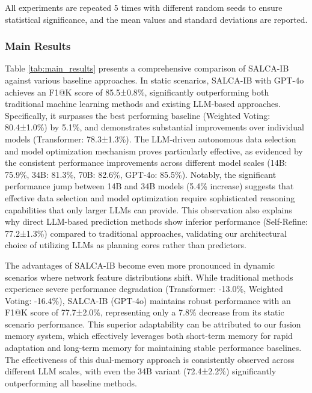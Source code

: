 \documentclass[conference]{IEEEtran}
\begin{document}
All experiments are repeated 5 times with different random seeds to ensure statistical significance, and the mean values and standard deviations are reported.

\subsubsection{Main Results}
Table \ref{tab:main_results} presents a comprehensive comparison of SALCA-IB against various baseline approaches. In static scenarios, SALCA-IB with GPT-4o achieves an F1@K score of 85.5±0.8\%, significantly outperforming both traditional machine learning methods and existing LLM-based approaches. Specifically, it surpasses the best performing baseline (Weighted Voting: 80.4±1.0\%) by 5.1\%, and demonstrates substantial improvements over individual models (Transformer: 78.3±1.3\%). The LLM-driven autonomous data selection and model optimization mechanism proves particularly effective, as evidenced by the consistent performance improvements across different model scales (14B: 75.9\%, 34B: 81.3\%, 70B: 82.6\%, GPT-4o: 85.5\%). Notably, the significant performance jump between 14B and 34B models (5.4\% increase) suggests that effective data selection and model optimization require sophisticated reasoning capabilities that only larger LLMs can provide. This observation also explains why direct LLM-based prediction methods show inferior performance (Self-Refine: 77.2±1.3\%) compared to traditional approaches, validating our architectural choice of utilizing LLMs as planning cores rather than predictors.

The advantages of SALCA-IB become even more pronounced in dynamic scenarios where network feature distributions shift. While traditional methods experience severe performance degradation (Transformer: -13.0\%, Weighted Voting: -16.4\%), SALCA-IB (GPT-4o) maintains robust performance with an F1@K score of 77.7±2.0\%, representing only a 7.8\% decrease from its static scenario performance. This superior adaptability can be attributed to our fusion memory system, which effectively leverages both short-term memory for rapid adaptation and long-term memory for maintaining stable performance baselines. The effectiveness of this dual-memory approach is consistently observed across different LLM scales, with even the 34B variant (72.4±2.2\%) significantly outperforming all baseline methods.
\end{document}
